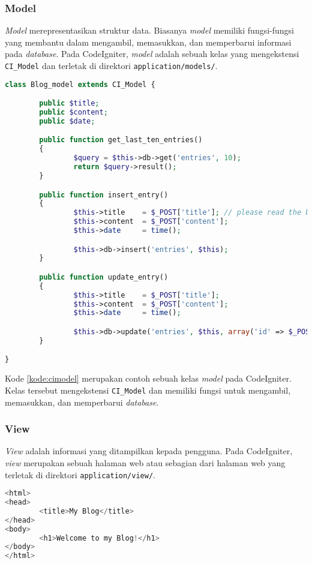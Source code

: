 \subsubsection{Model}
\textit{Model} merepresentasikan struktur data. Biasanya \textit{model} memiliki fungsi-fungsi yang membantu dalam mengambil, memasukkan, dan memperbarui informasi pada \textit{database}. Pada CodeIgniter, \textit{model} adalah sebuah kelas yang mengekstensi \verb|CI_Model| dan terletak di direktori \verb|application/models/|.

\begin{lstlisting}[language=php, caption=Contoh \textit{model}, label=kode:cimodel]
class Blog_model extends CI_Model {

        public $title;
        public $content;
        public $date;

        public function get_last_ten_entries()
        {
                $query = $this->db->get('entries', 10);
                return $query->result();
        }

        public function insert_entry()
        {
                $this->title    = $_POST['title']; // please read the below note
                $this->content  = $_POST['content'];
                $this->date     = time();

                $this->db->insert('entries', $this);
        }

        public function update_entry()
        {
                $this->title    = $_POST['title'];
                $this->content  = $_POST['content'];
                $this->date     = time();

                $this->db->update('entries', $this, array('id' => $_POST['id']));
        }

}
\end{lstlisting}

Kode \ref{kode:cimodel} merupakan contoh sebuah kelas \textit{model} pada CodeIgniter. Kelas tersebut mengekstensi \verb|CI_Model| dan memiliki fungsi untuk mengambil, memasukkan, dan memperbarui \textit{database}.
	
\subsubsection{View}
\textit{View} adalah informasi yang ditampilkan kepada pengguna. Pada CodeIgniter, \textit{view} merupakan sebuah halaman web atau sebagian dari halaman web yang terletak di direktori \verb|application/view/|.

\begin{lstlisting}[language=php, caption=Contoh \textit{view}, label=kode:ciview]
<html>
<head>
        <title>My Blog</title>
</head>
<body>
        <h1>Welcome to my Blog!</h1>
</body>
</html>
\end{lstlisting}

